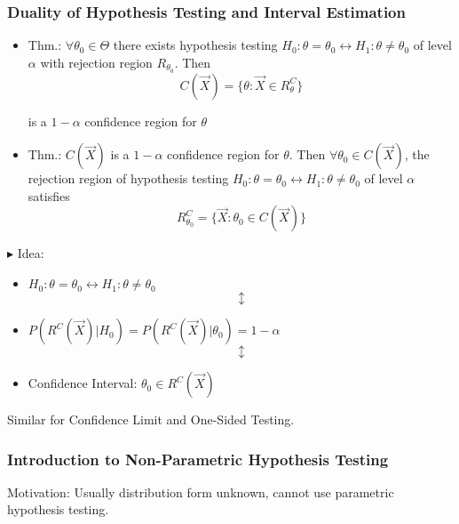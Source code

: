 \documentclass[11pt,a4paper]{ctexart}
\numberwithin{equation}{section}%
\newenvironment{point}{\raggedright$\blacktriangleright$}{}%
\begin{document}
\subsubsection{Duality of Hypothesis Testing and Interval Estimation}

\begin{itemize}
    \item Thm.: $\forall\theta_0\in\Theta$ there exists hypothesis testing $H_0:\theta=\theta_0\longleftrightarrow H_1:\theta\neq\theta_0$ of level $\alpha$ with rejection region $R_{\theta_0}$. Then
    \[
        C(\vec{X})=\{\theta:\vec{X}\in R^C_{\theta}\}
    \]

    is a $1-\alpha$ confidence region for $\theta$

    \item Thm.: $C(\vec{X})$ is a $1-\alpha$ confidence region for $\theta$. Then $\forall\theta_0\in C(\vec{X})$, the rejection region of hypothesis testing $H_0:\theta=\theta_0\longleftrightarrow H_1:\theta\neq\theta_0$ of level $\alpha$ satisfies
    \[
    R^C_{\theta_0}=\{\vec{X}:\theta_0\in C(\vec{X})\}
    \]
\end{itemize}
    
    \begin{point}
        Idea:
    \end{point}
    
        
\begin{itemize}[itemsep=-3pt]
    \item[] \centering $H_0:\theta=\theta_0\longleftrightarrow H_1:\theta\neq\theta_0$
    \[\updownarrow\]
    \item[] \centering $P(R^C(\vec{X})|H_0)=P(R^C(\vec{X})|\theta_0)=1-\alpha$
    \[\updownarrow\]
    \item[] Confidence Interval: $\theta_0\in R^C(\vec{X})$
\end{itemize}

    Similar for Confidence Limit and One-Sided Testing.

\subsubsection{Introduction to Non-Parametric Hypothesis Testing}\label{SubSectionNonIntroToParametricHypothesisTesting}

    Motivation: Usually distribution form unknown, cannot use parametric hypothesis testing.
\end{document}
